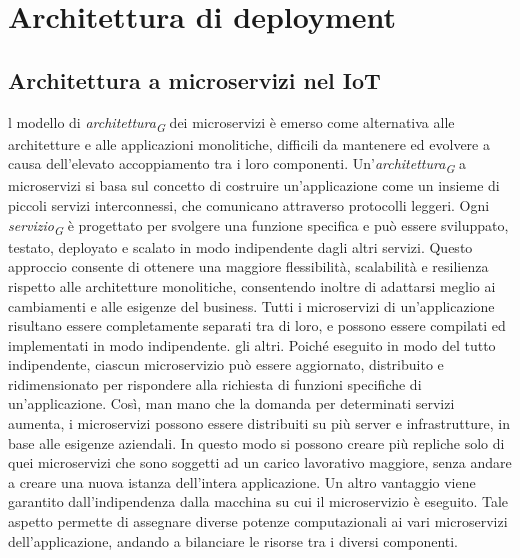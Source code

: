 \section{Architettura di deployment}
\begin{comment}
    L'\textit{architettura}\textsubscript{\textit{G}} di deployment, detta anche "\textit{architettura}\textsubscript{\textit{G}} di rilascio", rappresenta la struttura e la configurazione di un \textit{sistema}\textsubscript{\textit{G}} \textit{software}\textsubscript{\textit{G}} in fase di esecuzione. Essa definisce come i componenti \textit{software}\textsubscript{\textit{G}}, i dati e le risorse di \textit{rete}\textsubscript{\textit{G}} sono distribuiti e interconnessi nell'ambiente di produzione.
\end{comment}


\subsection{Architettura a microservizi nel IoT}
l modello di \textit{architettura}\textsubscript{\textit{G}} dei microservizi è emerso come alternativa alle architetture e alle applicazioni monolitiche, difficili da mantenere ed evolvere a causa dell'elevato accoppiamento tra i loro componenti. Un'\textit{architettura}\textsubscript{\textit{G}} a microservizi si basa sul concetto di costruire un'applicazione come un insieme di piccoli servizi interconnessi, che comunicano attraverso protocolli leggeri. Ogni \textit{servizio}\textsubscript{\textit{G}} è progettato per svolgere una funzione specifica e può essere sviluppato, testato, deployato e scalato in modo indipendente dagli altri servizi. Questo approccio consente di ottenere una maggiore flessibilità, scalabilità e resilienza rispetto alle architetture monolitiche, consentendo inoltre di adattarsi meglio ai cambiamenti e alle esigenze del business.
Tutti i microservizi di un’applicazione risultano essere completamente separati
tra di loro, e possono essere compilati ed implementati in modo indipendente.
gli altri.
Poiché eseguito in modo del tutto indipendente, ciascun microservizio può essere
aggiornato, distribuito e ridimensionato per rispondere alla richiesta di funzioni
specifiche di un’applicazione. Così, man mano che la domanda per determinati
servizi aumenta, i microservizi possono essere distribuiti su più server e infrastrutture, in base alle esigenze aziendali. In questo modo si possono creare più repliche
solo di quei microservizi che sono soggetti ad un carico lavorativo maggiore, senza
andare a creare una nuova istanza dell’intera applicazione.
Un altro vantaggio viene garantito dall’indipendenza dalla macchina su cui
il microservizio è eseguito. Tale aspetto permette di assegnare diverse potenze
computazionali ai vari microservizi dell’applicazione, andando a bilanciare le risorse
tra i diversi componenti.


